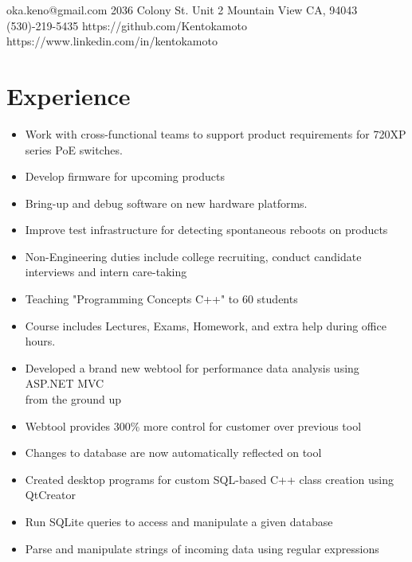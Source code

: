 \documentclass{Custom_CV}
\begin{document}
{oka.keno@gmail.com}
{2036 Colony St. Unit 2}
{Mountain View CA, 94043}
{(530)-219-5435}
{https://github.com/Kentokamoto}
{https://www.linkedin.com/in/kentokamoto}


\section{Experience}
\begin{itemize}[noitemsep]
    \item Work with cross-functional teams to support product requirements for 720XP series PoE switches.
    \item Develop firmware for upcoming products
    \item Bring-up and debug software on new hardware platforms.
    \item Improve test infrastructure for detecting spontaneous reboots on products
    \item Non-Engineering duties include college recruiting, conduct candidate interviews and intern care-taking
\end{itemize}

\begin{itemize}[noitemsep]
    \item Teaching "Programming Concepts C++" to 60 students
    \item Course includes Lectures, Exams, Homework, and extra help during office hours.
\end{itemize}
\begin{itemize}[rightmargin=\dimexpr\linewidth-15cm-\leftmargin\relax,noitemsep]
    \item Developed a brand new webtool for performance data analysis using ASP.NET MVC\\ from the ground up
    \item Webtool provides 300\% more control for customer over previous tool
    \item Changes to database are now automatically reflected on tool
\end{itemize}
\begin{itemize}[rightmargin=\dimexpr\linewidth-15cm-\leftmargin\relax,noitemsep]
\item Created desktop programs for custom SQL-based C++ class creation using QtCreator
\item Run SQLite queries to access and manipulate a given database
\item Parse and manipulate strings of incoming data using regular expressions
\end{itemize}
\end{document}
